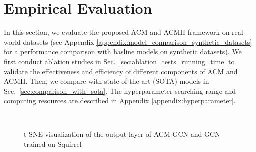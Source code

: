 \documentclass{article}
\newcommand{\0}{{\boldsymbol{0}}}
\newcommand{\6}{{\partial}}
\newcommand{\8}{{\infty}}
\newcommand{\4}{{\nabla}}
\begin{document}
\section{Empirical Evaluation}
\vspace{-0.2cm}
\label{sec:experiments}
In this section, we evaluate the proposed ACM and ACMII framework on real-world datasets (see Appendix \ref{appendix:model_comparison_synthetic_datasets} for a performance comparison with basline models on synthetic datasets). We first conduct ablation studies in Sec.~\ref{sec:ablation_tests_running_time} to validate the effectiveness and efficiency of different components of ACM and ACMII. Then, we compare with  state-of-the-art (SOTA) models in Sec.~\ref{sec:comparison_with_sota}.  The hyperparameter searching range and computing resources are described in Appendix \ref{appendix:hyperparameter}.
\begin{figure}[H]
    \centering
     {
      \\
     
     }
     \caption{t-SNE visualization of the output layer of ACM-GCN and GCN trained on Squirrel}
     \label{fig:visualization_acmgcn}
\end{figure}
\vspace{-0.4cm}
\iffalse
\begin{figure*}[t!]
  \begin{center}
    \texttt{[image: tsne\_visualization.pdf]}
  \end{center}
  \caption{t-SNE Visualization of the output layer of ACM-GCN and GCN trained on Squirrel}
  
  \label{fig:visualization_acmgcn}
\end{figure*}
\fi
\end{document}
